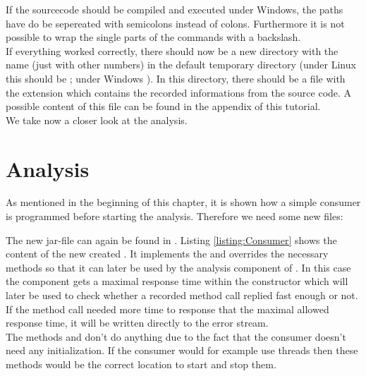 		\setBashListing 		
					

		\warning If the sourcecode should be compiled and executed under Windows, the paths have do be sepereated with semicolons instead of colons. Furthermore it is not possible to wrap the single parts of the commands with a backslash.\\
		If everything worked correctly, there should now be a new directory with the name  (just with other numbers) in the default temporary directory (under Linux this should be ; under Windows ). In this directory, there should be a file with the extension  which contains the recorded informations from the source code. A possible content of this file can be found in the appendix of this tutorial.\\
		We take now a closer look at the analysis.

	\section{Analysis}
		As mentioned in the beginning of this chapter, it is shown how a simple consumer is programmed before starting the analysis. Therefore we need some new files:

		
		The new jar-file can again be found in . Listing \ref{listing:Consumer} shows the content of the new created . It implements the  and overrides the necessary methods so that it can later be used by the analysis component of \Kieker. In this case the component gets a maximal response time within the constructor which will later be used to check whether a recorded method call replied fast enough or not. If the method call needed more time to response that the maximal allowed response time, it will be written directly to the error stream.\\
		The methods  and  don't do anything due to the fact that the consumer doesn't need any initialization. If the consumer would for example use threads then these methods would be the correct location to start and stop them.


